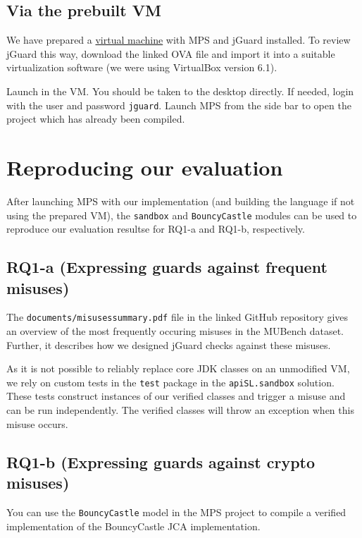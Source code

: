 \documentclass[parskip=full]{scrreprt}
\begin{document}
\subsection{Via the prebuilt VM}

We have prepared a \href{https://zenodo.org/record/5767812/files/jGuard_fixed.ova?download=1}{virtual machine} with MPS and jGuard installed.
To review jGuard this way, download the linked OVA file and import it into a suitable virtualization software (we were using VirtualBox version 6.1).

Launch in the VM. You should be taken to the desktop directly. If needed, login with the user and password \texttt{jguard}. Launch MPS from the side bar to open the project which has already been compiled.

\section{Reproducing our evaluation}

After launching MPS with our implementation (and building the language if not using the prepared VM), the \texttt{sandbox} and \texttt{BouncyCastle} modules can be used to
reproduce our evaluation resultse for RQ1-a and RQ1-b, respectively.

\subsection{RQ1-a (Expressing guards against frequent misuses)}

The \texttt{documents/misusessummary.pdf} file in the linked GitHub repository gives an
overview of the most frequently occuring misuses in the MUBench dataset.
Further, it describes how we designed jGuard checks against these misuses.

As it is not possible to reliably replace core JDK classes on an unmodified VM, we rely
on custom tests in the \texttt{test} package in the \texttt{apiSL.sandbox} solution.
These tests construct instances of our verified classes and trigger a misuse and can be
run independently.
The verified classes will throw an exception when this misuse occurs.

\subsection{RQ1-b (Expressing guards against crypto misuses)}

You can use the \texttt{BouncyCastle} model in the MPS project to compile a verified implementation of the BouncyCastle JCA implementation.
\end{document}
